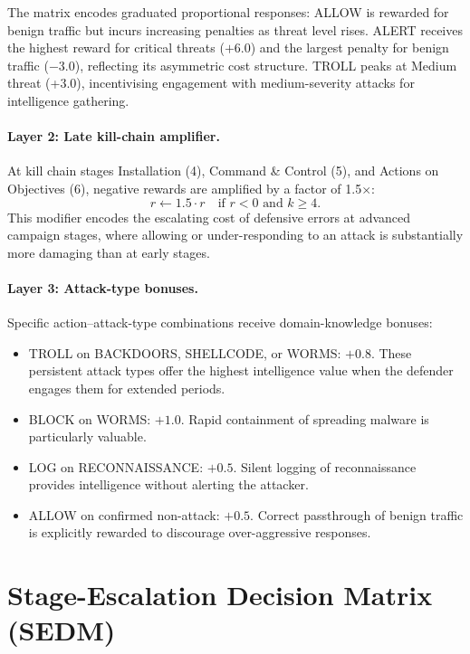 The matrix encodes graduated proportional responses: ALLOW is rewarded for
benign traffic but incurs increasing penalties as threat level rises.
ALERT receives the highest reward for critical threats ($+6.0$) and the
largest penalty for benign traffic ($-3.0$), reflecting its asymmetric cost
structure.
TROLL peaks at Medium threat (+3.0), incentivising engagement with
medium-severity attacks for intelligence gathering.

\paragraph{Layer 2: Late kill-chain amplifier.}
At kill chain stages Installation (4), Command \& Control (5), and
Actions on Objectives (6), negative rewards are amplified by a factor of
1.5$\times$:
%
\begin{equation}
  r \leftarrow 1.5 \cdot r \quad \text{if } r < 0 \text{ and } k \geq 4.
\end{equation}
%
This modifier encodes the escalating cost of defensive errors at advanced
campaign stages, where allowing or under-responding to an attack is
substantially more damaging than at early stages.

\paragraph{Layer 3: Attack-type bonuses.}
Specific action--attack-type combinations receive domain-knowledge bonuses:
%
\begin{itemize}
  \item TROLL on BACKDOORS, SHELLCODE, or WORMS: $+0.8$.
        These persistent attack types offer the highest intelligence value
        when the defender engages them for extended periods.
  \item BLOCK on WORMS: $+1.0$.
        Rapid containment of spreading malware is particularly valuable.
  \item LOG on RECONNAISSANCE: $+0.5$.
        Silent logging of reconnaissance provides intelligence without
        alerting the attacker.
  \item ALLOW on confirmed non-attack: $+0.5$.
        Correct passthrough of benign traffic is explicitly rewarded to
        discourage over-aggressive responses.
\end{itemize}

\section{Stage-Escalation Decision Matrix (SEDM)}
\label{sec:sedm}

